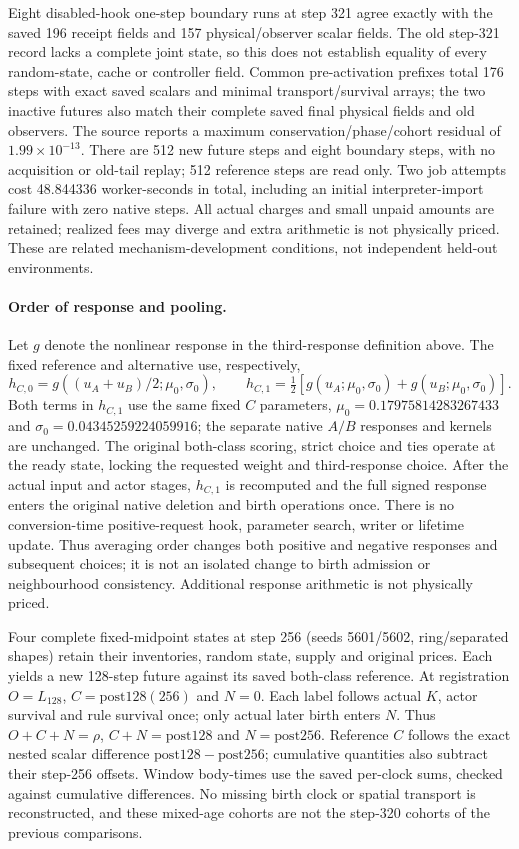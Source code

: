 Eight disabled-hook one-step boundary runs at step 321 agree exactly with the saved 196 receipt fields and 157 physical/observer scalar fields. The old step-321 record lacks a complete joint state, so this does not establish equality of every random-state, cache or controller field. Common pre-activation prefixes total 176 steps with exact saved scalars and minimal transport/survival arrays; the two inactive futures also match their complete saved final physical fields and old observers. The source reports a maximum conservation/phase/cohort residual of $1.99\times10^{-13}$. There are 512 new future steps and eight boundary steps, with no acquisition or old-tail replay; 512 reference steps are read only. Two job attempts cost 48.844336 worker-seconds in total, including an initial interpreter-import failure with zero native steps. All actual charges and small unpaid amounts are retained; realized fees may diverge and extra arithmetic is not physically priced. These are related mechanism-development conditions, not independent held-out environments.

\paragraph{Order of response and pooling.}Let $g$ denote the nonlinear response in the third-response definition above. The fixed reference and alternative use, respectively,
\[
h_{C,0}=g\!\left((u_A+u_B)/2;\mu_0,\sigma_0\right),\qquad
h_{C,1}=\tfrac12\left[g(u_A;\mu_0,\sigma_0)+g(u_B;\mu_0,\sigma_0)\right].
\]
Both terms in $h_{C,1}$ use the same fixed $C$ parameters, $\mu_0=0.17975814283267433$ and $\sigma_0=0.04345259224059916$; the separate native $A/B$ responses and kernels are unchanged. The original both-class scoring, strict choice and ties operate at the ready state, locking the requested weight and third-response choice. After the actual input and actor stages, $h_{C,1}$ is recomputed and the full signed response enters the original native deletion and birth operations once. There is no conversion-time positive-request hook, parameter search, writer or lifetime update. Thus averaging order changes both positive and negative responses and subsequent choices; it is not an isolated change to birth admission or neighbourhood consistency. Additional response arithmetic is not physically priced.

Four complete fixed-midpoint states at step 256 (seeds 5601/5602, ring/separated shapes) retain their inventories, random state, supply and original prices. Each yields a new 128-step future against its saved both-class reference. At registration $O=L_{128}$, $C=\mathrm{post128}(256)$ and $N=0$. Each label follows actual $K$, actor survival and rule survival once; only actual later birth enters $N$. Thus $O+C+N=\rho$, $C+N=\mathrm{post128}$ and $N=\mathrm{post256}$. Reference $C$ follows the exact nested scalar difference $\mathrm{post128}-\mathrm{post256}$; cumulative quantities also subtract their step-256 offsets. Window body-times use the saved per-clock sums, checked against cumulative differences. No missing birth clock or spatial transport is reconstructed, and these mixed-age cohorts are not the step-320 cohorts of the previous comparisons.


